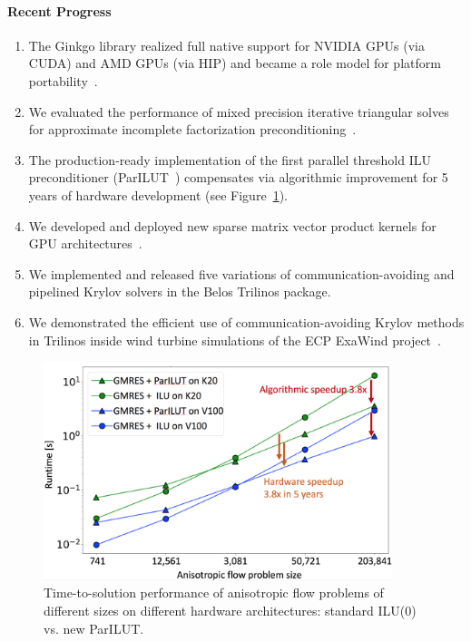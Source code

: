 \paragraph{Recent Progress}
\begin{enumerate}
\item 
The Ginkgo library realized full native support for NVIDIA GPUs (via CUDA) and 
AMD GPUs (via HIP) and became a role model for platform 
portability~\cite{tsai2020preparing}.
\item
We evaluated the performance of mixed precision iterative triangular solves for 
approximate incomplete factorization 
preconditioning~\cite{goebel2020multiprecision}.
\item 
The production-ready implementation of the first parallel threshold ILU 
preconditioner (ParILUT~\cite{ipdps_anzt}) compensates via algorithmic 
improvement for 5 years of hardware development (see 
Figure~\ref{fig:ParILUTperf}).
\item 
We developed and deployed new sparse matrix vector product kernels for GPU 
architectures~\cite{anzt2020load}.
\item
We implemented and released five variations of communication-avoiding
and pipelined Krylov solvers in the Belos Trilinos package.
\item
We demonstrated the efficient use of communication-avoiding Krylov methods in Trilinos
inside wind turbine simulations of the ECP ExaWind 
project~\cite{Yamazaki-lowsynch}.
\end{enumerate}

\begin{figure}[htb]
	\centering
	\includegraphics[width=4in]{../../../projects/2.3.3-MathLibs/2.3.3.13-CLOVER/parilut_speedup}
	\caption{\label{fig:ParILUTperf}Time-to-solution performance of anisotropic 
	flow problems of different sizes on different hardware architectures: 
	standard ILU(0) vs. new ParILUT.}
\end{figure}


